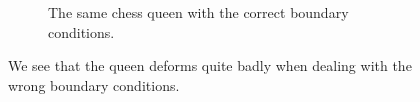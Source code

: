 \begin{figure}[ht]
\begin{subfigure}[b]{0.45 \textwidth}
                \caption{The same chess queen with the correct boundary conditions.}
        \end{subfigure}
        \caption{We see that the queen deforms quite badly when dealing with the wrong boundary conditions. }
        \label{fig:queens}
\end{figure}


